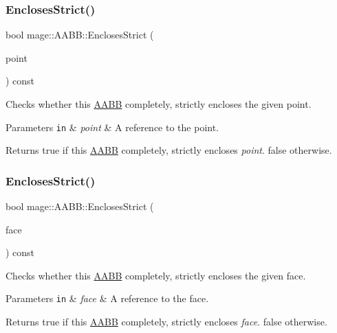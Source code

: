 \subsubsection{\texorpdfstring{Encloses\+Strict()}{EnclosesStrict()}\hspace{0.1cm}{\footnotesize\ttfamily [2/3]}}
{\footnotesize\ttfamily bool mage\+::\+A\+A\+B\+B\+::\+Encloses\+Strict (\begin{DoxyParamCaption}\item[{const X\+M\+F\+L\+O\+A\+T3 \&}]{point }\end{DoxyParamCaption}) const}

Checks whether this \hyperlink{structmage_1_1_a_a_b_b}{A\+A\+BB} completely, strictly encloses the given point.


\begin{DoxyParams}[1]{Parameters}
\mbox{\tt in}  & {\em point} & A reference to the point. \\
\hline
\end{DoxyParams}
\begin{DoxyReturn}{Returns}
{\ttfamily true} if this \hyperlink{structmage_1_1_a_a_b_b}{A\+A\+BB} completely, strictly encloses {\itshape point}. {\ttfamily false} otherwise. 
\end{DoxyReturn}
\hypertarget{structmage_1_1_a_a_b_b_acc5a6584d01c80abf5a59405b21e1a2c}{}\label{structmage_1_1_a_a_b_b_acc5a6584d01c80abf5a59405b21e1a2c} 
\subsubsection{\texorpdfstring{Encloses\+Strict()}{EnclosesStrict()}\hspace{0.1cm}{\footnotesize\ttfamily [3/3]}}
{\footnotesize\ttfamily bool mage\+::\+A\+A\+B\+B\+::\+Encloses\+Strict (\begin{DoxyParamCaption}\item[{const \hyperlink{structmage_1_1_face}{Face} \&}]{face }\end{DoxyParamCaption}) const}

Checks whether this \hyperlink{structmage_1_1_a_a_b_b}{A\+A\+BB} completely, strictly encloses the given face.


\begin{DoxyParams}[1]{Parameters}
\mbox{\tt in}  & {\em face} & A reference to the face. \\
\hline
\end{DoxyParams}
\begin{DoxyReturn}{Returns}
{\ttfamily true} if this \hyperlink{structmage_1_1_a_a_b_b}{A\+A\+BB} completely, strictly encloses {\itshape face}. {\ttfamily false} otherwise. 
\end{DoxyReturn}
\hypertarget{structmage_1_1_a_a_b_b_a5a959edc3bc5ccdd29025d612c2e66e3}{}\label{structmage_1_1_a_a_b_b_a5a959edc3bc5ccdd29025d612c2e66e3} 
